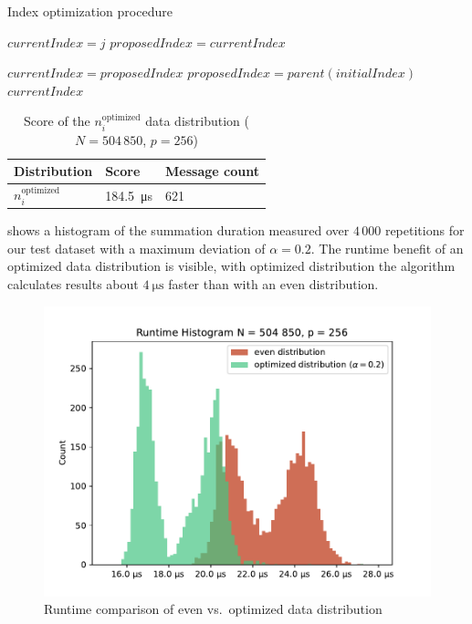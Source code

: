 \begin{algorithm}
\caption{Index optimization procedure}\label{algo:optimizeIndex}
\DontPrintSemicolon
\SetAlgoLined
{}

$currentIndex = j$\;
$proposedIndex = currentIndex$\;

 {
	$currentIndex = proposedIndex$\;
	$proposedIndex = parent(initialIndex)$\;
}
\Return $currentIndex$\;
\end{algorithm}


\begin{table}
\centering
\begin{tabular}{l|l|l}
Distribution & Score & Message count \\
\hline
$n_i^\textrm{optimized}$ & \SI{184.5}{\micro\second} & 621
\end{tabular}
\caption{Score of the $n_i^\textrm{optimized}$ data distribution ($N = 504\,850$, $p=256$)}
\label{table:Power2DistributionScore}
\end{table}

 shows a histogram of the summation duration measured over $4\,000$ repetitions for our test dataset with a maximum deviation of $\alpha = 0.2$.
The runtime benefit of an optimized data distribution is visible, with optimized distribution the algorithm calculates results about $\SI{4}{\micro\second}$ faster than with  an even distribution.

\begin{figure}
\centering
\includegraphics[scale=0.75]{figures/distribution_experiment}
\caption{Runtime comparison of even vs.\ optimized data distribution}
\label{fig:distribution_runtimes}
\end{figure}


